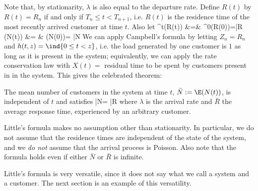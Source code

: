 Note that, by stationarity, $\lambda$ is also equal to the departure
rate. Define $R(t)$ by $R(t)=R_n$ if and only if $T_n\leq
t<T_{n+1}$, i.e. $R(t)$ is the residence time of the most recently
arrived customer at time $t$. Also let
\bearn
   \E^t(R(t)) &=& \E^0(R(0))=\bar{R}
   \\
   \E(N(t)) &= & \E(N(0))= \bar{N}
  \eearn
We can apply Campbell's formula by letting
$Z_n=R_n$ and $h(t,z)=\ind{0 \leq t < z}$, i.e.
the load generated by one customer is $1$ as long
as it is present in the system; equivalently, we
can apply the rate conservation law with $X(t)=$
residual time to be spent by customers present in
in the system. This gives the celebrated theorem:
\begin{shadethm}
\label{theo-little}
 The mean number of customers in the system at time $t$,
$\bar{N}:=\E(N(t))$, is independent of $t$ and satisfies \ben
 \bar{N}= \lambda \bar{R}
\een where $\lambda$ is the arrival rate and $\bar{R}$ the
average response time, experienced by an arbitrary customer.
\end{shadethm}

Little's formula makes no assumption other than
stationarity. In particular, we do not assume
that the residence times are independent of the
state of the system, and we \emph{do not} assume
that the arrival process is Poisson. Also note
that the formula holds even if either $\bar{N}$
or $\bar{R}$ is infinite.

Little's formula is very versatile, since it does
not say what we call a system and a customer. The
next section is an example of this versatility.

